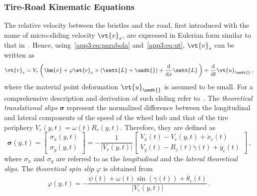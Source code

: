 
\subsubsection{Tire-Road Kinematic Equations}
\label{app3:sec:kinematic_equations}

The relative velocity between the bristles and the road, first introduced with the name of micro-sliding velocity $\vt{v}_s$, are expressed in Eulerian form similar to that in~\cite{romano2019novel, romano2020unsteadystate, romano2022brush, romano2022analytical, pacejka2012tire, guiggiani2014science, limebeer2018dynamics}. Hence, using~\eqref{app3:eq:parabola} and~\eqref{app3:eq:ut}, $\vt{v}_s$ can be written as
%
\begin{equation}
  \vt{v}_s = V_r\left(\bm{\sigma} + \varphi\et{e}_z \times \left(\sett{L} + \undt{}\right) + \dfrac{\mathrm{d}}{\mathrm{d}x}\sett{L}\,\right) + \dfrac{\mathrm{d}}{\mathrm{d}t}\vt{u}_{\undt{}} \, \text{,}
  \label{app3:eq:v_s}
\end{equation}
%
where the material point deformation $\vt{u}_{\undt{}}$ is assumed to be small. For a comprehensive description and derivation of such sliding refer to~\cite{rill2020road, pacejka2012tire, guiggiani2014science, limebeer2018dynamics, romano2019novel, romano2022brush, romano2022analytical}. The \emph{theoretical translational slips} $\bm{\sigma}$ represent the normalized difference between the longitudinal and lateral components of the speed of the wheel hub and that of the tire periphery $V_r(y,t) = \omega(t)R_r(y,t)$. Therefore, they are defined as
%
\begin{equation*}
  \bm{\sigma}(y,t) =
  \begin{bmatrix}
    \sigma_x(y,t) \\[0.2em]
    \sigma_y(y,t)
  \end{bmatrix}
  = -\dfrac{1}{|V_r(y,t)|}
  \begin{bmatrix}
    V_x(t) - V_r(y,t) + \dot{x}_c(t) \\[0.2em]
    V_y(t) - R_z(t)\dot{\gamma}(t) + \dot{y}_c(t)
  \end{bmatrix} \, \text{,}
\end{equation*}
%
where $\sigma_x$ and $\sigma_y$ are referred to as the \emph{longitudinal} and the \emph{lateral theoretical slips}. The \emph{theoretical spin slip} $\varphi$ is obtained from
%
\begin{equation*}
  \varphi(y,t) = -\dfrac{\dot{\psi}(t) + \omega(t)\sin(\gamma(t)) + \dot{\theta}_c(t)}{|V_r(y,t)|} \, \text{.}
\end{equation*}
